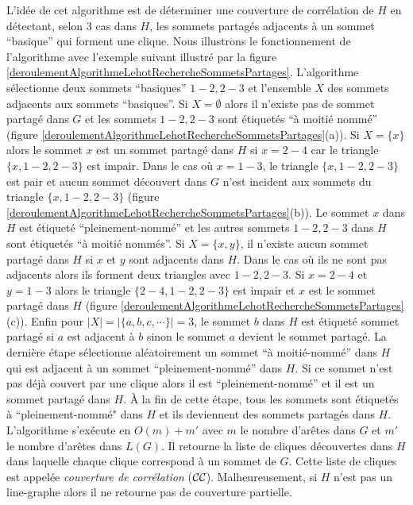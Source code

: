 L'id\'ee de cet algorithme est de d\'eterminer une couverture de corr\'elation de $H$ en d\'etectant, selon $3$ cas \cite{decompositionEnCliquesParArcs} dans $H$, 
les sommets partag\'es adjacents \`a un sommet ``basique'' qui forment une clique.
Nous illustrons le fonctionnement de l'algorithme avec l'exemple suivant illustr\'e par la figure \ref{deroulementAlgorithmeLehotRechercheSommetsPartages}.
L'algorithme s\'electionne deux sommets ``basiques''  $1-2, 2-3$ et  l'ensemble $X$ des sommets adjacents aux sommets ``basiques''.
Si $X = \emptyset$ alors il n'existe pas de sommet partag\'e dans  $G$ et les sommets $1-2, 2-3$ sont \'etiquet\'es ``\`a moiti\'e nomm\'e'' (figure \ref{deroulementAlgorithmeLehotRechercheSommetsPartages}(a)).
Si $X=\{x\}$ alors le sommet $x$ est un sommet partag\'e dans  $H$ si $x = 2-4$ car le triangle $\{x, 1-2, 2-3\}$ est impair. Dans le cas o\`u $x = 1-3$, le  triangle $\{x, 1-2, 2-3\}$ est pair et
aucun sommet d\'ecouvert dans $G$ n'est incident aux sommets du triangle $\{x, 1-2, 2-3\}$ (figure \ref{deroulementAlgorithmeLehotRechercheSommetsPartages}(b)). 
Le sommet $x$ dans $H$ est \'etiquet\'e ``pleinement-nomm\'e'' et les autres sommets $1-2, 2-3$ dans $H$ sont \'etiquet\'es ``\`a moiti\'e nomm\'es''.
Si $X=\{x,y\}$, il n'existe  aucun sommet partag\'e dans  $H$ si $x$ et $y$ sont adjacents dans $H$. Dans le cas o\`u  ils ne sont pas adjacents alors ils forment deux triangles avec $1-2, 2-3$. Si $x=2-4$ et $y=1-3$ alors le triangle $\{2-4,1-2, 2-3\}$ est impair et $x$ est le sommet partag\'e dans $H$
(figure \ref{deroulementAlgorithmeLehotRechercheSommetsPartages}(c)).
Enfin pour $|X| = |\{a,b,c, \cdots\}| = 3$, le sommet $b$ dans $H$ est \'etiquet\'e sommet partag\'e si $a$ est adjacent \`a $b$ sinon le sommet $a$ devient le sommet partag\'e.
La derni\`ere \'etape s\'electionne al\'eatoirement un sommet ``\`a moiti\'e-nomm\'e'' dans $H$ qui est adjacent \`a un sommet  ``pleinement-nomm\'e'' dans $H$. Si ce sommet n'est pas d\'ej\`a couvert par une clique alors il est ``pleinement-nomm\'e'' et il est un sommet partag\'e dans $H$. 
\`A la fin de cette \'etape, tous les sommets sont \'etiquet\'es \`a ``pleinement-nomm\'e"  dans $H$ et ils deviennent des sommets partag\'es dans $H$.
\newline
L'algorithme s'ex\'ecute  en $O(m)+m'$ avec $m$  le nombre d'ar\^etes dans $G$ et $m'$ le nombre d'ar\^etes dans $L(G)$. Il retourne la liste de cliques d\'ecouvertes dans $H$ dans laquelle chaque clique correspond  \`a un sommet de $G$. Cette liste de cliques est appel\'ee {\em couverture de corr\'elation} (${\cal CC}$).
Malheureusement, si $H$ n'est pas un line-graphe alors il ne retourne pas de couverture partielle.

